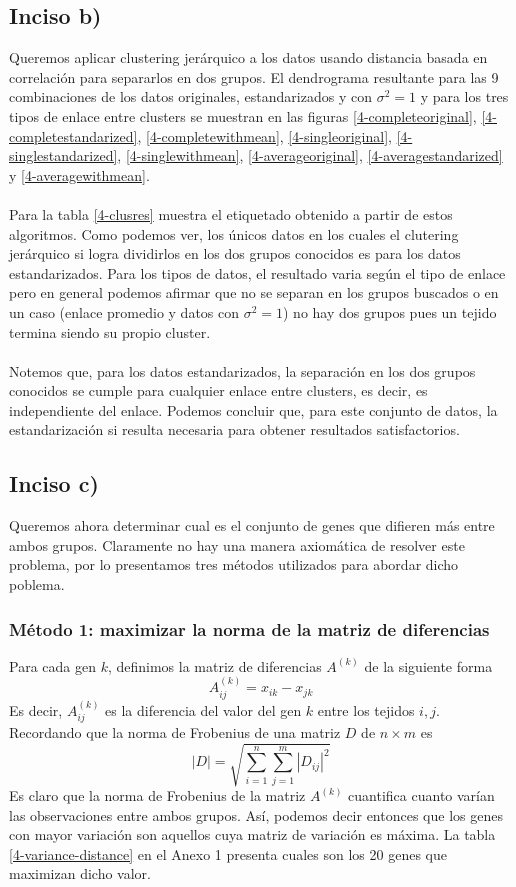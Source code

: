 \documentclass[11pt]{article}
\begin{document}
\subsection{Inciso b)}
Queremos aplicar clustering jerárquico a los datos usando distancia basada en correlación para separarlos en dos grupos. El dendrograma resultante para las 9 combinaciones de los datos originales, estandarizados y con $\sigma^2 = 1$ y para los tres tipos de enlace entre clusters se muestran en las figuras \ref{4-completeoriginal}, \ref{4-completestandarized}, \ref{4-completewithmean}, \ref{4-singleoriginal}, \ref{4-singlestandarized}, \ref{4-singlewithmean}, \ref{4-averageoriginal}, \ref{4-averagestandarized} y  \ref{4-averagewithmean}.
\\
\\Para la tabla \ref{4-clusres} muestra el etiquetado obtenido a partir de estos algoritmos. Como podemos ver, los únicos datos en los cuales el clutering jerárquico si logra dividirlos en los dos grupos conocidos es para los datos estandarizados. Para los tipos de datos, el resultado varia según el tipo de enlace pero en general podemos afirmar que no  se separan en los grupos buscados o en un caso (enlace promedio y datos con $\sigma^2 = 1$) no hay dos grupos pues un tejido termina siendo su propio cluster.
\\
\\Notemos que, para los datos estandarizados, la separación en los dos grupos conocidos se cumple para cualquier enlace entre clusters, es decir, es independiente del enlace. Podemos concluir que, para este conjunto de datos, la estandarización si resulta necesaria para obtener resultados satisfactorios.
\subsection{Inciso c)}
Queremos ahora determinar cual es el conjunto de genes que difieren más entre ambos grupos. Claramente no hay una manera axiomática de resolver este problema, por lo presentamos tres métodos utilizados para abordar dicho poblema.
\subsubsection{Método 1: maximizar la norma de la matriz de diferencias}
Para cada gen $k$, definimos la matriz de diferencias $A^{(k)}$ de la siguiente forma
\begin{equation}
    A^{(k)}_{ij} = x_{ik} - x_{jk}
\end{equation}
Es decir, $A^{(k)}_{ij}$ es la diferencia del valor del gen $k$ entre los tejidos $i,j$. Recordando que la norma de Frobenius de una matriz $D$ de $n \times m$ es
\begin{equation}
    |D| = \sqrt{ \sum_{i=1}^{n} \sum_{j=1}^{m} |D_{ij}|^2 }
\end{equation}
Es claro que la norma de Frobenius de la matriz $A^{(k)}$ cuantifica cuanto varían las observaciones entre ambos grupos. Así, podemos decir entonces que los genes con mayor variación son aquellos cuya matriz de variación es máxima. La tabla \ref{4-variance-distance} en el Anexo 1 presenta cuales son los 20 genes que maximizan dicho valor. 
\end{document}
